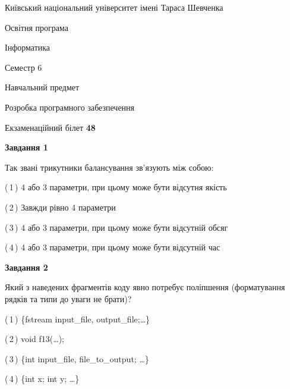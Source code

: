 \documentclass[10pt, ukrainian]{article}
\begin{document}
{{\begin {small}\par
{ \center  Київський національний університет імені Тараса Шевченка \par}
{\parbox {5 cm}{Освітня програма \hfill}{\parbox {7 cm}{Інформатика \hfill}}\parbox {6 cm}{\hfill Семестр 6}}\par
{\parbox {5 cm} {Навчальний предмет \hfill}\parbox {7 cm}{Розробка програмного забезпечення \hfill}\parbox {6cm}{\hfill}\par}\vspace{-7pt} \end{small}}{\center Екзаменаційний білет \No \textbf
{ 48 }\par}}
{
\begin {large}
{\begin {center}\textbf{Завдання 1}\end {center}}\par
Так звані трикутники балансування зв'язують між собою:\par
\vspace{2mm}



(\,1\,) 4 або 3 параметри, при цьому може бути відсутня якість%



(\,2\,) Завжди рівно 4 параметри%



(\,3\,) 4 або 3 параметри, при цьому може бути відсутній обсяг %



(\,4\,) 4 або 3 параметри, при цьому може бути відсутній час%


{\begin {center}\textbf{Завдання 2}\end {center}}\par
Який з наведених фрагментів коду явно потребує поліпшення (форматування рядків та типи до уваги не брати)?\par
\vspace{2mm}



(\,1\,) \{fstream input\_file, output\_file;…\} %



(\,2\,) void f13(…);%



(\,3\,) \{int input\_file, file\_to\_output; …\}%



(\,4\,) \{int x; int y; …\}%



\end{large}}
\end{document}

